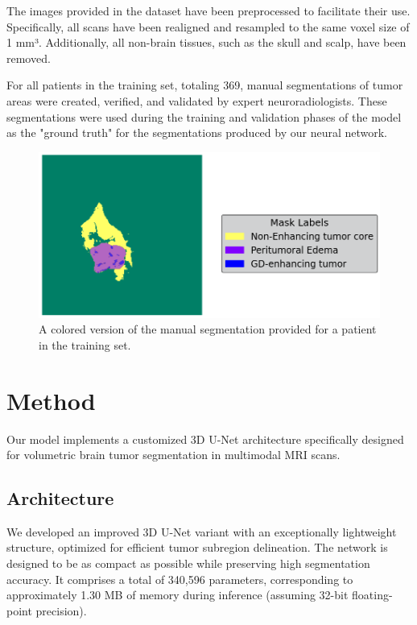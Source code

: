 \documentclass[10pt,twocolumn,letterpaper]{article}
\begin{document}
The images provided in the dataset have been preprocessed to facilitate their use. Specifically, all scans have been realigned and resampled to the same voxel size of 1 mm³. Additionally, all non-brain tissues, such as the skull and scalp, have been removed.

For all patients in the training set, totaling 369, manual segmentations of tumor areas were created, verified, and validated by expert neuroradiologists. These segmentations were used during the training and validation phases of the model as the "ground truth" for the segmentations produced by our neural network.

\begin{figure}[H]
    \centering
    \includegraphics[width=0.65\linewidth]{img/groundtruth_example.png}
    \caption{A colored version of the manual segmentation provided for a patient in the training set.}
\end{figure}


\section{Method}
Our model implements a customized 3D U-Net architecture specifically designed for volumetric brain tumor segmentation in multimodal MRI scans.

\subsection{Architecture}
We developed an improved 3D U-Net variant with an exceptionally lightweight structure, optimized for efficient tumor subregion delineation. The network is designed to be as compact as possible while preserving high segmentation accuracy. It comprises a total of 340,596 parameters, corresponding to approximately 1.30 MB of memory during inference (assuming 32-bit floating-point precision).
\end{document}

